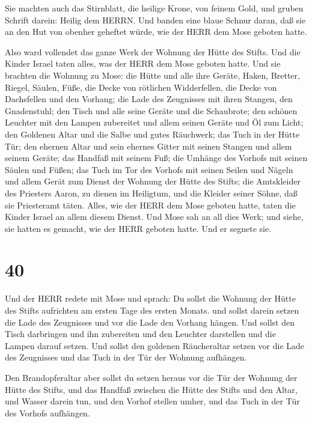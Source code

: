  Sie machten auch das Stirnblatt, die heilige Krone, von
feinem Gold, und gruben Schrift darein: Heilig dem HERRN. 
Und banden eine blaue Schnur daran, daß sie an den Hut von obenher
geheftet würde, wie der HERR dem Mose geboten hatte.

 Also ward vollendet das ganze Werk der Wohnung der Hütte
des Stifts. Und die Kinder Israel taten alles, was der HERR dem Mose
geboten hatte.  Und sie brachten die Wohnung zu Mose: die
Hütte und alle ihre Geräte, Haken, Bretter, Riegel, Säulen, Füße,
 die Decke von rötlichen Widderfellen, die Decke von
Dachsfellen und den Vorhang;  die Lade des Zeugnisses mit
ihren Stangen, den Gnadenstuhl;  den Tisch und alle seine
Geräte und die Schaubrote;  den schönen Leuchter mit den
Lampen zubereitet und allem seinen Geräte und Öl zum Licht;
 den Goldenen Altar und die Salbe und gutes Räuchwerk; das
Tuch in der Hütte Tür;  den ehernen Altar und sein ehernes
Gitter mit seinen Stangen und allem seinem Geräte; das Handfaß mit
seinem Fuß;  die Umhänge des Vorhofs mit seinen Säulen und
Füßen; das Tuch im Tor des Vorhofs mit seinen Seilen und Nägeln und
allem Gerät zum Dienst der Wohnung der Hütte des Stifts; 
die Amtskleider des Priesters Aaron, zu dienen im Heiligtum, und die
Kleider seiner Söhne, daß sie Priesteramt täten.  Alles,
wie der HERR dem Mose geboten hatte, taten die Kinder Israel an allem
diesem Dienst.  Und Mose sah an all dies Werk; und siehe,
sie hatten es gemacht, wie der HERR geboten hatte. Und er segnete sie.

\hypertarget{section-39}{%
\section{40}\label{section-39}}

 Und der HERR redete mit Mose und sprach:  Du
sollst die Wohnung der Hütte des Stifts aufrichten am ersten Tage des
ersten Monats.  und sollst darein setzen die Lade des
Zeugnisses und vor die Lade den Vorhang hängen.  Und sollst
den Tisch darbringen und ihn zubereiten und den Leuchter darstellen und
die Lampen darauf setzen.  Und sollst den goldenen
Räucheraltar setzen vor die Lade des Zeugnisses und das Tuch in der Tür
der Wohnung aufhängen.

 Den Brandopferaltar aber sollst du setzen heraus vor die
Tür der Wohnung der Hütte des Stifts,  und das Handfaß
zwischen die Hütte des Stifts und den Altar, und Wasser darein tun,
 und den Vorhof stellen umher, und das Tuch in der Tür des
Vorhofs aufhängen.

